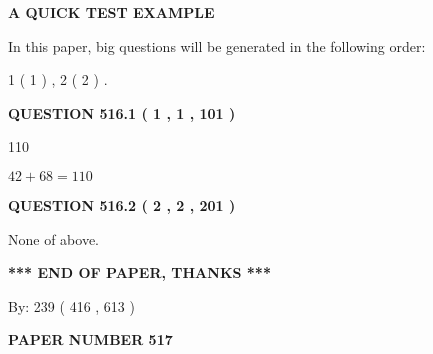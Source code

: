 \documentclass[12pt]{article}
\begin{document}
   
 \vspace{0.2in}
{\LARGE {\textbf{ A QUICK TEST EXAMPLE}}}
   
   
   
\vspace{0.2in}
   
In this paper, big questions will be generated in the following order: 
   
   
   1 ( 1 )
 ,
   2 ( 2 )
 .
  
\vspace{0.2in}
  
{\textbf{\Large{QUESTION
516.1 
 ( 1 , 1 , 101 )
}}}
  
  
 
 
\noindent{}

110
 
 
 
 
\noindent{}

$ %
42 +  %
68=   %
110$
 
 
  
\vspace{0.2in}
  
{\textbf{\Large{QUESTION
516.2 
 ( 2 , 2 , 201 )
}}}
  
  
 
 
\noindent{}
 
 
 None of above.
 
 
 
 
   
   
 \vspace{0.2in}
 
   
   
   
   
\vspace{1.0in} 
{\textbf{\large{ *** END OF PAPER, THANKS *** }}} 
   
   
\hspace{1.0in} By: 
 239 ( 416 ,  613 )
   
   
   
   
\newpage 
\setcounter{page}{ 
   517001 } 
   
   
   
   
 {\textbf{ \Large{ PAPER NUMBER  517  }}}
   
   
\vspace{0.2in}
   
\end{document}
